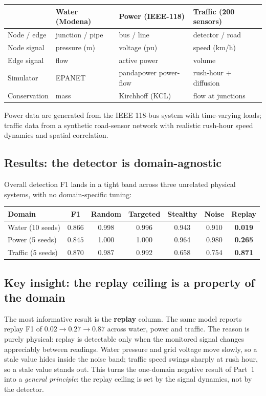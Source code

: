 \documentclass[11pt,a4paper]{article}
\begin{document}
\begin{center}\small
\begin{tabularx}{\linewidth}{@{}l X X X@{}}
\toprule
 & \textbf{Water (Modena)} & \textbf{Power (IEEE-118)} & \textbf{Traffic (200 sensors)}\\
\midrule
Node / edge   & junction / pipe & bus / line & detector / road \\
Node signal   & pressure (m)    & voltage (pu) & speed (km/h) \\
Edge signal   & flow            & active power & volume \\
Simulator     & EPANET          & pandapower power-flow & rush-hour + diffusion \\
Conservation  & mass            & Kirchhoff (KCL) & flow at junctions \\
\bottomrule
\end{tabularx}
\end{center}

Power data are generated from the IEEE 118-bus system with time-varying
loads; traffic data from a synthetic road-sensor network with realistic
rush-hour speed dynamics and spatial correlation.

\subsection{Results: the detector is domain-agnostic}
Overall detection F1 lands in a tight band across three unrelated physical
systems, with no domain-specific tuning:

\begin{center}\small
\begin{tabularx}{\linewidth}{@{}l C C C C C C@{}}
\toprule
\textbf{Domain} & \textbf{F1} & Random & Targeted & Stealthy & Noise & \textbf{Replay}\\
\midrule
Water (10 seeds)   & $0.866$ & 0.998 & 0.996 & 0.943 & 0.910 & \textbf{0.019} \\
Power (5 seeds)    & $0.845$ & 1.000 & 1.000 & 0.964 & 0.980 & \textbf{0.265} \\
Traffic (5 seeds)  & $0.870$ & 0.987 & 0.992 & 0.658 & 0.754 & \textbf{0.871} \\
\bottomrule
\end{tabularx}
\end{center}

\newpage
\subsection{Key insight: the replay ceiling is a property of the domain}
The most informative result is the \textbf{replay} column. The same model
reports replay F1 of $0.02 \to 0.27 \to 0.87$ across water, power and
traffic. The reason is purely physical: replay is detectable only when the
monitored signal changes appreciably between readings. Water pressure and
grid voltage move slowly, so a stale value hides inside the noise band;
traffic speed swings sharply at rush hour, so a stale value stands out.
This turns the one-domain negative result of Part~1 into a
\emph{general principle}: the replay ceiling is set by the signal
dynamics, not by the detector.
\end{document}
